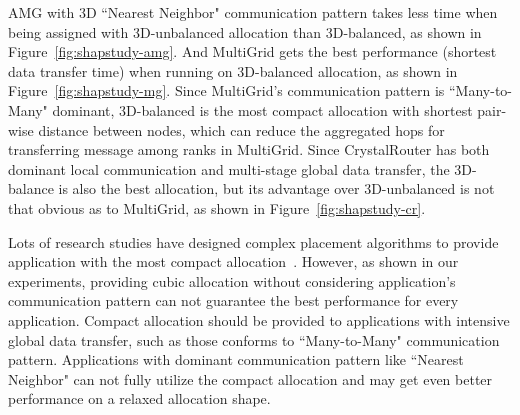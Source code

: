 AMG with 3D ``Nearest Neighbor" communication pattern takes less time 
when being assigned with 3D-unbalanced allocation than 3D-balanced, 
as shown in Figure~\ref{fig:shapstudy-amg}. 
And MultiGrid gets the best performance (shortest data transfer time) 
when running on 3D-balanced allocation, as shown in Figure~\ref{fig:shapstudy-mg}. 
Since MultiGrid's communication pattern is ``Many-to-Many" dominant, 
3D-balanced is the most compact allocation with shortest pair-wise distance between nodes, 
which can reduce the aggregated hops for transferring message among ranks in MultiGrid. 
Since CrystalRouter has both dominant local communication and multi-stage global data transfer, 
the 3D-balance is also the best allocation, but its advantage over 3D-unbalanced is not 
that obvious as to MultiGrid, as shown in Figure~\ref{fig:shapstudy-cr}.

Lots of research studies have designed complex placement algorithms 
to provide application with the most compact allocation~\cite{leung,LO}. 
However, as shown in our experiments, providing cubic allocation without 
considering application's communication pattern can not guarantee 
the best performance for every application. 
Compact allocation should be provided to applications with intensive global data transfer, 
such as those conforms to ``Many-to-Many" communication pattern. 
Applications with dominant communication pattern like ``Nearest Neighbor" 
can not fully utilize the compact allocation and 
may get even better performance on a relaxed allocation shape. 



